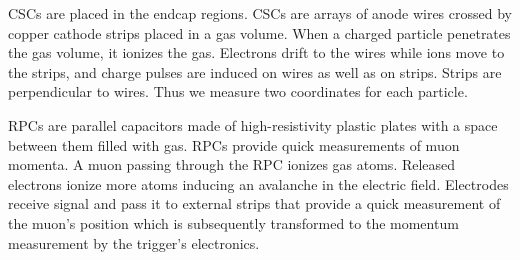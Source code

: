 CSCs are placed in the endcap regions. CSCs are arrays of anode wires crossed by copper cathode strips placed in a gas volume. When a charged particle penetrates the gas volume, it ionizes the gas. Electrons drift to the wires while ions move to the strips, and charge pulses are induced on wires as well as on strips. Strips are perpendicular to wires. Thus we measure two coordinates for each particle.  

RPCs are parallel capacitors made of high-resistivity plastic plates with a space between them filled with gas. RPCs provide quick measurements of muon momenta. A muon passing through the RPC ionizes gas atoms. Released electrons ionize more atoms inducing an avalanche in the electric field. Electrodes receive signal and pass it to external strips that provide a quick measurement of the muon's position which is subsequently transformed to the momentum measurement by the trigger's electronics. 


